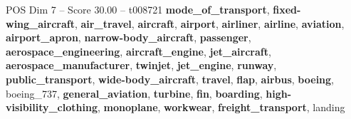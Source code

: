 \begin{textsample}{POS Dim 7 – Score 30.00 – t008721}  \label{ex:f7_pos_003}
\textbf{mode\_of\_transport}, \textbf{fixed-wing\_aircraft}, \textbf{air\_travel}, \textbf{aircraft}, \textbf{airport}, \textbf{airliner}, \textbf{airline}, \textbf{aviation}, \textbf{airport\_apron}, \textbf{narrow-body\_aircraft}, \textbf{passenger}, \textbf{aerospace\_engineering}, \textbf{aircraft\_engine}, \textbf{jet\_aircraft}, \textbf{aerospace\_manufacturer}, \textbf{twinjet}, \textbf{jet\_engine}, \textbf{runway}, \textbf{public\_transport}, \textbf{wide-body\_aircraft}, \textbf{travel}, \textbf{flap}, \textbf{airbus}, \textbf{boeing}, boeing\_737, \textbf{general\_aviation}, \textbf{turbine}, \textbf{fin}, \textbf{boarding}, \textbf{high-visibility\_clothing}, \textbf{monoplane}, \textbf{workwear}, \textbf{freight\_transport}, landing

\end{textsample}

